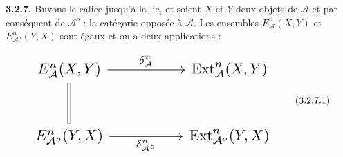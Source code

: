 \medskip\noindent\textbf{3.2.7.}\quad
Buvons le calice jusqu'à la lie, et soient $X$ et $Y$ deux objets de
$\mathcal A$ et par conséquent de $\mathcal A^o$ : la catégorie opposée à
$\mathcal A$. Les ensembles $E_{\mathcal A}^{n}(X,Y)$ et
$E_{\mathcal A^o}^{n}(Y,X)$ sont égaux et on a deux applications :

\begin{equation}
\resizebox{0.74\textwidth}{!}{%
$\begin{tikzcd}[ampersand replacement=\&,column sep=5.0em,row sep=2.8em]
E_{\mathcal A}^{n}(X,Y)
  \arrow[r,"{\delta_{\mathcal A}^{n}}"]
  \arrow[d,equal]
\& \operatorname{Ext}_{\mathcal A}^{n}(X,Y) \\
E_{\mathcal A^o}^{n}(Y,X)
  \arrow[r,"{\delta_{\mathcal A^o}^{n}}"']
\& \operatorname{Ext}_{\mathcal A^o}^{n}(Y,X)
\end{tikzcd}$%
}
\tag{3.2.7.1}
\end{equation}
\endgroup
